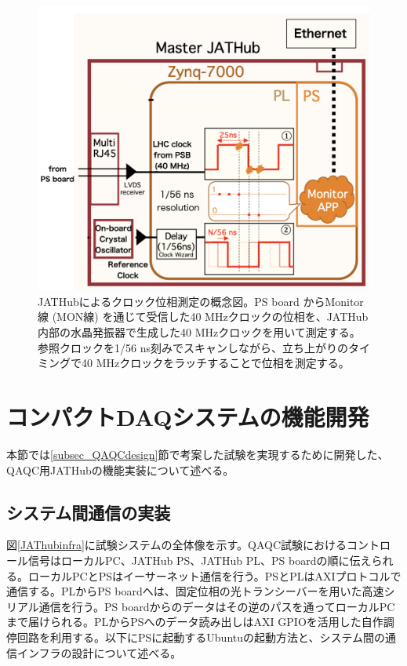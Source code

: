 \begin{figure} 
    \centering
    \includegraphics[width=14cm]{fig/QAQC/JATHubclockmasurement.png}
    \caption[JATHubによるクロック位相測定の概念図]{JATHubによるクロック位相測定の概念図\cite{mt_atanaka}。PS board からMonitor線 (MON線) を通じて受信した40 MHzクロックの位相を、JATHub内部の水晶発振器で生成した40 MHzクロックを用いて測定する。参照クロックを1/56 ns刻みでスキャンしながら、立ち上がりのタイミングで40 MHzクロックをラッチすることで位相を測定する。}
    \label{JATHubclockmeasure}
\end{figure}    

\clearpage
\section{コンパクトDAQシステムの機能開発}
\label{sec_QAQC_JATHub}
本節では\ref{subsec_QAQCdesign}節で考案した試験を実現するために開発した、QAQC用JATHubの機能実装について述べる。

\subsection{システム間通信の実装}
\label{subsec_infra}
図\ref{JAThubinfra}に試験システムの全体像を示す。QAQC試験におけるコントロール信号はローカルPC、JATHub PS、JATHub PL、PS boardの順に伝えられる。ローカルPCとPSはイーサーネット通信を行う。PSとPLはAXIプロトコルで通信する。PLからPS boardへは、固定位相の光トランシーバーを用いた高速シリアル通信を行う。PS boardからのデータはその逆のパスを通ってローカルPCまで届けられる。PLからPSへのデータ読み出しはAXI GPIOを活用した自作調停回路を利用する。以下にPSに起動するUbuntuの起動方法と、システム間の通信インフラの設計について述べる。

